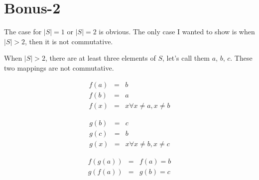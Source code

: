 \section*{Bonus-2}
The case for $ |S| = 1 $ or $ |S| = 2 $ is obvious. The only case I wanted to show is when $ |S| > 2 $, then it is not commutative.

When $ |S| > 2 $, there are at least three elements of $ S $, let's call them $ a $, $ b $, $ c $. These two mappings are not commutative.

\begin{eqnarray*}
    f(a) &=& b \\
    f(b) &=& a \\
    f(x) &=& x \forall x \ne a, x \ne b
\end{eqnarray*}

\begin{eqnarray*}
    g(b) &=& c \\
    g(c) &=& b \\
    g(x) &=& x \forall x \ne b, x \ne c
\end{eqnarray*}

\begin{eqnarray*}
    f(g(a)) &=& f(a) = b \\
    g(f(a)) &=& g(b) = c
\end{eqnarray*}